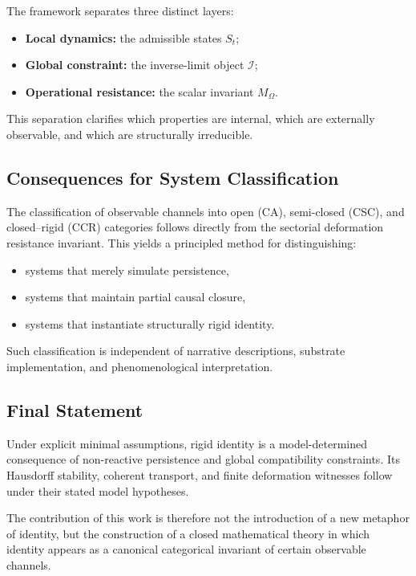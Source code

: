 \documentclass[11pt,a4paper]{article}
\theoremstyle{plain}
\theoremstyle{definition}
\theoremstyle{remark}
\begin{document}
The framework separates three distinct layers:
\begin{itemize}[leftmargin=*]
    \item \textbf{Local dynamics:} the admissible states $S_t$;
    \item \textbf{Global constraint:} the inverse-limit object $\mathcal{I}$;
    \item \textbf{Operational resistance:} the scalar invariant $M_\Omega$.
\end{itemize}

This separation clarifies which properties are internal, which are externally observable, and which are structurally irreducible.

\subsection{Consequences for System Classification}

The classification of observable channels into open (CA), semi-closed (CSC), and closed--rigid (CCR) categories follows directly from the sectorial deformation resistance invariant. This yields a principled method for distinguishing:
\begin{itemize}[leftmargin=*]
    \item systems that merely simulate persistence,
    \item systems that maintain partial causal closure,
    \item systems that instantiate structurally rigid identity.
\end{itemize}

Such classification is independent of narrative descriptions, substrate implementation, and phenomenological interpretation.

\subsection{Final Statement}

Under explicit minimal assumptions, rigid identity is a model-determined consequence of non-reactive persistence and global compatibility constraints. Its Hausdorff stability, coherent transport, and finite deformation witnesses follow under their stated model hypotheses.

The contribution of this work is therefore not the introduction of a new metaphor of identity, but the construction of a closed mathematical theory in which identity appears as a canonical categorical invariant of certain observable channels.
\end{document}
